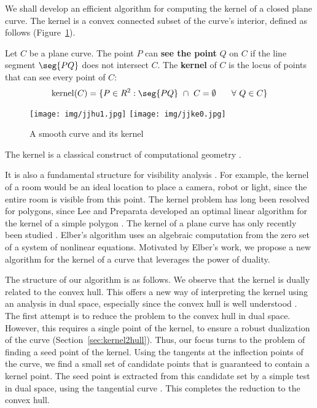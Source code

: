 \documentclass[12pt]{article}
\newif\ifJournal
\begin{document}
We shall develop an efficient 
algorithm for computing the kernel of a closed plane curve.
The kernel is a convex connected subset of the curve's interior,
defined as follows (Figure~\ref{fig:curveob1b}).

\begin{defn2}
\label{defn:kernel}
Let $C$ be a plane curve.
The point $P$ can {\bf see the point} $Q$ on $C$
if the line segment $\seg{PQ}$ does not intersect $C$.
The {\bf kernel} of $C$ is the locus of points that can see every
point of $C$:
\[
\mbox{kernel}(C) = \{ P \in R^2: \seg{PQ} \ \cap \ C = \emptyset 
		\hspace{.25in} \forall \ Q \in C \}
\]
\end{defn2}

\begin{figure}[b]
\begin{center}
\texttt{[image: img/jjhu1.jpg]}
\texttt{[image: img/jjke0.jpg]}
\end{center}
\caption{A smooth curve and its kernel}
\label{fig:curveob1b}
\end{figure}

The kernel is a classical construct of computational geometry
\cite{preparata85,goodman97}.
\ifJournal
Star-shaped polygons, polygons with nontrivial kernels, are an 
important class.
\fi
It is also a fundamental structure for visibility analysis \cite{orourke87}.
For example, the kernel of a room would be an ideal location to place a camera, 
robot or light, since the entire room is visible from this point.
The kernel problem has long been resolved for polygons,
since Lee and Preparata developed an optimal linear algorithm 
for the kernel of a simple polygon \cite{lee79}.
The kernel of a plane curve has only recently been studied \cite{elber02}.
Elber's algorithm uses an algebraic computation from the zero set of a 
system of nonlinear equations.
Motivated by Elber's work, we propose a new algorithm for the kernel of a
curve that leverages the power of duality.

The structure of our algorithm is as follows.
We observe that the kernel is dually related to the convex hull.
This offers a new way of interpreting the kernel using an analysis
in dual space, especially since the convex hull is well
understood \cite{elber01,jj02hull}.
The first attempt is to reduce the problem to the convex hull in dual space.
However, this requires a single point of the kernel,
to ensure a robust dualization of the curve (Section~\ref{sec:kernel2hull}).
Thus, our focus turns to the problem of finding a seed point of the kernel.
Using the tangents at the inflection points of the curve,
we find a small set of candidate points that is guaranteed to contain
a kernel point.
The seed point is extracted from this candidate set by a simple test
in dual space, using the tangential curve \cite{jj01,jj02}.
This completes the reduction to the convex hull.
\end{document}
